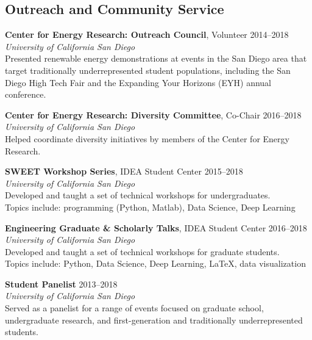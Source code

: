 \documentclass[10pt]{res}
\begin{document}
\begin{resume}
\section{Outreach and Community Service}
\vspace{0.1in}
%

\textbf{Center for Energy Research: Outreach Council}, Volunteer \hfill 2014--2018 \\
\textit{University of California San Diego} \\
Presented renewable energy demonstrations at events in the San Diego area that
target traditionally underrepresented student populations, including the San Diego
High Tech Fair and the Expanding Your Horizons (EYH) annual conference.

\textbf{Center for Energy Research: Diversity Committee}, Co-Chair \hfill 2016--2018 \\
\textit{University of California San Diego} \\
Helped coordinate diversity initiatives by members of the Center for Energy Research.

\textbf{SWEET Workshop Series}, IDEA Student Center \hfill 2015--2018 \\
\textit{University of California San Diego} \\
Developed and taught a set of technical workshops for undergraduates. \\
Topics include: programming (Python, Matlab), Data Science, Deep Learning

\textbf{Engineering Graduate \& Scholarly Talks}, IDEA Student Center \hfill 2016--2018\\
\textit{University of California San Diego} \\
Developed and taught a set of technical workshops for graduate students. \\
Topics include: Python, Data Science, Deep Learning, LaTeX, data visualization

\textbf{Student Panelist} \hfill 2013--2018 \\
\textit{University of California San Diego} \\
Served as a panelist for a range of events focused on graduate school,
undergraduate research, and first-generation and traditionally underrepresented
students.



\end{resume}
\end{document}
